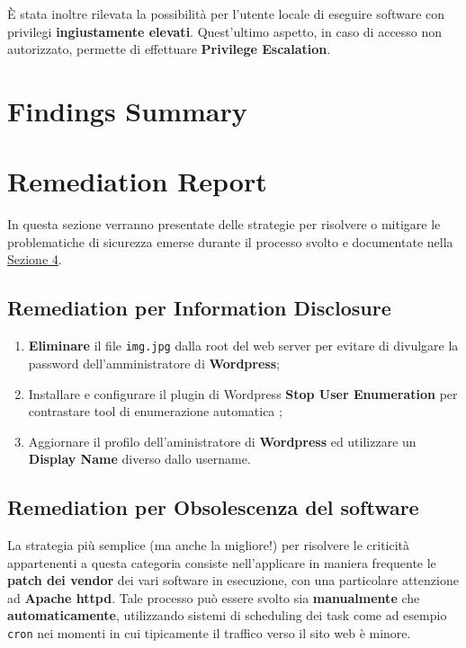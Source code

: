 \documentclass[a4paper, 12pt, oneside]{article}
\begin{document}
È stata inoltre rilevata la possibilità per l'utente locale di eseguire software con privilegi \textbf{ingiustamente elevati}. Quest'ultimo aspetto, in caso di accesso non autorizzato, permette di effettuare \textbf{Privilege Escalation}.

\newpage
\section{Findings Summary}
\newpage

\section{Remediation Report}
In questa sezione verranno presentate delle strategie per risolvere o mitigare le problematiche di sicurezza emerse durante il processo svolto e documentate nella \hyperref[sec:vulnrep]{Sezione 4}.

\subsection{Remediation per \textbf{Information Disclosure}}
\begin{enumerate}
    \item \textbf{Eliminare} il file \texttt{img.jpg} dalla root del web server per evitare di divulgare la password dell'amministratore di \textbf{Wordpress};
    \item Installare e configurare il plugin di Wordpress \textbf{Stop User Enumeration} per contrastare tool di enumerazione automatica \cite{sue};
    \item Aggiornare il profilo dell'aministratore di \textbf{Wordpress} ed utilizzare un \textbf{Display Name} diverso dallo username.
\end{enumerate}

\subsection{Remediation per \textbf{Obsolescenza del software}}
La strategia più semplice (ma anche la migliore!) per risolvere le criticità appartenenti a questa categoria consiste nell'applicare in maniera frequente le \textbf{patch dei vendor} dei vari software in esecuzione, con una particolare attenzione ad \textbf{Apache httpd}. Tale processo può essere svolto sia \textbf{manualmente} che \textbf{automaticamente}, utilizzando sistemi di scheduling dei task come ad esempio \texttt{cron} nei momenti in cui tipicamente il traffico verso il sito web è minore.
\end{document}
